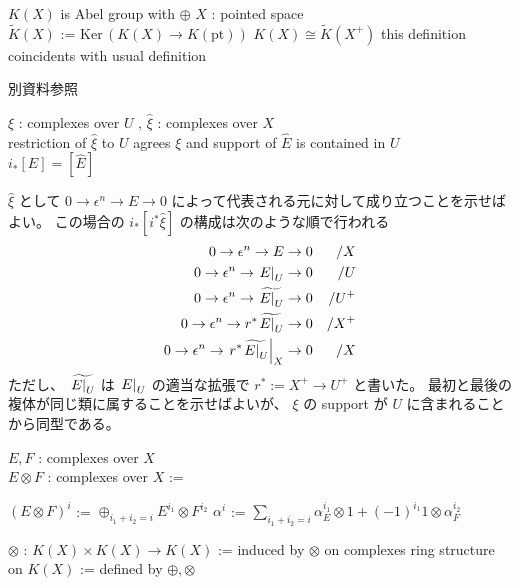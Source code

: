 \begin{Theorem}[\(K(X)\) の基本的な性質]
\itemprop
  \Then \(K(X)\) is Abel group with \(\oplus\)
\itemdefi
  \For \(X\) : pointed space \\
  \Define \(\tilde{K}(X)\) := \(\text{Ker} \, (K(X) \to K(\text{pt}))\)
\itemprop
  \Then \(K(X) \cong \tilde{K}(X^+)\)
\itemprop
  \Then this definition coincidents with usual definition
\end{Theorem}

\begin{Proof}
\itemprof
  別資料参照
\end{Proof}

\begin{Theorem}
\itemprop
  \For \(\xi\) : complexes over \(U\) , \(\hat{\xi}\) : complexes over \(X\) \\
  \IfHold restriction of \(\hat{\xi}\) to \(U\) agrees \(\xi\) and support of \(\hat{E}\) is contained in \(U\) \\
  \Then \(i_* [E] = [\hat{E}]\)
\end{Theorem}

\begin{Proof}
\itemprof
  \(\hat{\xi}\) として \(0 \to \epsilon^n \to E \to 0\) によって代表される元に対して成り立つことを示せばよい。
  この場合の \(i_* [i^* \hat{\xi}]\) の構成は次のような順で行われる
  \begin{align*}
    0 \to \epsilon^n \to E \to 0 & &/ X \\
    0 \to \epsilon^n \to \left. {E} \right| _{U} \to 0 & &/ U \\
    0 \to \epsilon^n \to \widetilde{\left. {E} \right| _{U}} \to 0 & &/ U^+ \\
    0 \to \epsilon^n \to r^* \widetilde{\left. {E} \right| _{U}} \to 0 & &/ X^+ \\
    0 \to \epsilon^n \to \left. {r^* \widetilde{\left. {E} \right| _{U}}} \right| _{X} \to 0 & &/ X
  \end{align*}
  ただし、 \(\widetilde{\left. {E} \right| _{U}}\) は \(\left. {E} \right| _{U}\) の適当な拡張で \(r^* := X^+ \to U^+\) と書いた。
  最初と最後の複体が同じ類に属することを示せばよいが、 \(\xi\) の support が \(U\) に含まれることから同型である。
\end{Proof}

\begin{Definition}[複体のテンソルと環構造]
\itemdefi
  \For \(E,F\) : complexes over \(X\) \\
  \Define \(E \otimes F\) : complexes over \(X\) :=
  \begin{itemize}
    \itemenum \((E \otimes F)^i\) := \(\oplus_{i_1 + i_2 = i} E^{i_1} \otimes F^{i_2}\)
    \itemenum \(\alpha^i\) := \(\sum_{i_1 + i_2 = i} \alpha_E^{i_1} \otimes 1 + (-1)^{i_1} 1 \otimes \alpha_F^{i_2}\)
  \end{itemize}
\itemdefi
  \Define \(\otimes\) : \(K(X) \times K(X) \to K(X)\) := induced by \(\otimes\) on complexes
\itemdefi
  \Define ring structure on \(K(X)\) := defined by \(\oplus,\otimes\)
\end{Definition}

